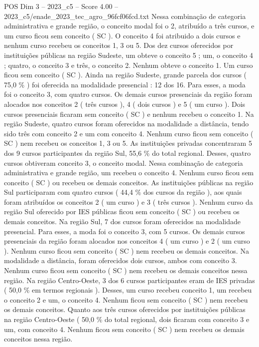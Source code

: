 \begin{textsample}{POS Dim 3 – 2023\_c5 – Score 4.00 – 2023\_c5/enade\_2023\_tec\_agro\_96fcf06fcd.txt}
Nessa combinação de categoria administrativa e grande região, o conceito modal foi o 2, atribuído a três cursos, e um curso ficou sem conceito ( SC ).
O conceito 4 foi atribuido a dois cursos e nenhum curso recebeu os conceitos 1, 3 ou 5.
Dos dez cursos oferecidos por instituições públicas na região Sudeste, um obteve o conceito 5 ; um, o conceito 4 ; quatro, o conceito 3 e três, o conceito 2.
Nenhum obteve o conceito 1.
Um curso ficou sem conceito ( SC ).
Ainda na região Sudeste, grande parcela dos cursos ( 75,0 \% ) foi oferecida na modalidade presencial : 12 dos 16.
Para esses, a moda foi o conceito 3, com quatro cursos.
Os demais cursos presenciais da região foram alocados nos conceitos 2 ( três cursos ), 4 ( dois cursos ) e 5 ( um curso ).
Dois cursos presenciais ficaram sem conceito ( SC ) e nenhum recebeu o conceito 1.
Na região Sudeste, quatro cursos foram oferecidos na modalidade a distância, tendo sido três com conceito 2 e um com conceito 4.
Nenhum curso ficou sem conceito ( SC ) nem recebeu os conceitos 1, 3 ou 5.
As instituições privadas concentraram 5 dos 9 cursos participantes da região Sul, 55,6 \% do total regional.
Desses, quatro cursos obtiveram conceito 3, o conceito modal.
Nessa combinação de categoria administrativa e grande região, um recebeu o conceito 4.
Nenhum curso ficou sem conceito ( SC ) ou recebeu os demais conceitos.
As instituições públicas na região Sul participaram com quatro cursos ( 44,4 \% dos cursos da região ), aos quais foram atribuídos os conceitos 2 ( um curso ) e 3 ( três cursos ).
Nenhum curso da região Sul oferecido por IES públicas ficou sem conceito ( SC ) ou recebeu os demais conceitos.
Na região Sul, 7 dos cursos foram oferecidos na modalidade presencial.
Para esses, a moda foi o conceito 3, com 5 cursos.
Os demais cursos presenciais da região foram alocados nos conceitos 4 ( um curso ) e 2 ( um curso ).
Nenhum curso ficou sem conceito ( SC ) nem recebeu os demais conceitos.
Na modalidade a distância, foram oferecidos dois cursos, ambos com conceito 3.
Nenhum curso ficou sem conceito ( SC ) nem recebeu os demais conceitos nessa região.
Na região Centro-Oeste, 3 dos 6 cursos participantes eram de IES privadas ( 50,0 \% em termos regionais ).
Desses, um curso recebeu conceito 1, um recebeu o conceito 2 e um, o conceito 4.
Nenhum ficou sem conceito ( SC ) nem recebeu os demais conceitos.
Quanto aos três cursos oferecidos por instituições públicas na região Centro-Oeste ( 50,0 \% do total regional, dois ficaram com conceito 3 e um, com conceito 4.
Nenhum ficou sem conceito ( SC ) nem recebeu os demais conceitos nessa região.

\end{textsample}
